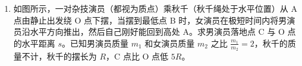 \documentclass[\gkver]{gaokaozhenti}
\begin{document}
\begin{enumerate}
{$m_{\mathrm{A}}g\sin\theta=kx_{1}$ ①

令 $x_{2}$ 表示 B 刚要离开 C 时弹簧的伸长量，$a$ 表示此时 A 的加速度，由胡克定律和牛顿定律可知：

$kx_{2}=m_{\mathrm{B}}g\sin\theta$ ②

$F-m_{\mathrm{A}}g\sin\theta-kx_{2}=m_{\mathrm{A}}a$ ③

由②③式可得 $a=\frac{F-(m_{\mathrm{A}}+m_{\mathrm{B}})g\sin\theta}{m_{\mathrm{A}}}$ ④

由题意：$d=x_{1}+x_{2}$ ⑤

由④⑤式可得 $d=\frac{(m_{\mathrm{A}}+m_{\mathrm{B}})g\sin\theta}{k}$
}

\item
如图所示，一对杂技演员（都视为质点）乘秋千（秋千绳处于水平位置）从 A 点由静止出发绕 O 点下摆，当摆到最低点 B 时，女演员在极短时间内将男演员沿水平方向推出，然后自己刚好能回到高处 A。求男演员落地点 C 与 O 点的水平距离 $s$。已知男演员质量 $m_{1}$ 和女演员质量 $m_{2}$ 之比 $\frac{m_{1}}{m_{2}}=2$，秋千的质量不计，秋千的摆长为 $R$，C 点比 O 点低 $5R$。




\end{enumerate}
\end{document}
